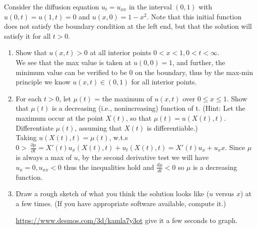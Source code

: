 \newpage
Consider the diffusion equation $u_t = u_{xx}$ in the interval $(0, 1)$ with $u(0, t) =
u(1, t) = 0$ and $u(x, 0) = 1 - x^2$. Note that this initial function does not
satisfy the boundary condition at the left end, but that the solution will
satisfy it for all $t > 0$.
\begin{enumerate}[(a )]
	\item
Show that $u(x, t) > 0$ at all interior points $0 < x < 1, 0 < t < \infty.$\\

We see that the max value is taken at $u(0,0)=1$, and further, the minimum value can be verified to be $0$ on the boundary, thus by the max-min principle we know $u(x,t) \in  (0,1)$ for all interior points. 
\item 
For each $t > 0$, let $\mu(t)$ = the maximum of $u(x, t)$ over $0 \leq   x \leq  1$.
      Show that $\mu (t)$ is a decreasing (i.e., nonincreasing) function of t.
      (Hint: Let the maximum occur at the point $X(t)$, so that $\mu (t) =
      u(X(t), t)$. Differentiate $\mu (t)$, assuming that $X(t)$ is differentiable.)\\

      Taking $u (X(t),t)=\mu(t)$, w.t.s $0>\ \frac{\partial \mu }{\partial t }=X'(t)u_x(X(t),t)+u_t(X(t),t)=X'(t)u_x+u_xx$. Since $\mu $ is always a max of $u$, by the second derivative test we will have $u_x=0, u_{xx}<0$ thus the inequalities hold and $\frac{ d \mu  }{dt}<0$ so $\mu$ is a decreasing function.
\item
	Draw a rough sketch of what you think the solution looks like ($u$
      versus $x$) at a few times. (If you have appropriate software available,
compute it.)

\href{https://www.desmos.com/3d/kamla7y3ot}{https://www.desmos.com/3d/kamla7y3ot} give it a few seconds to graph.
\end{enumerate}
